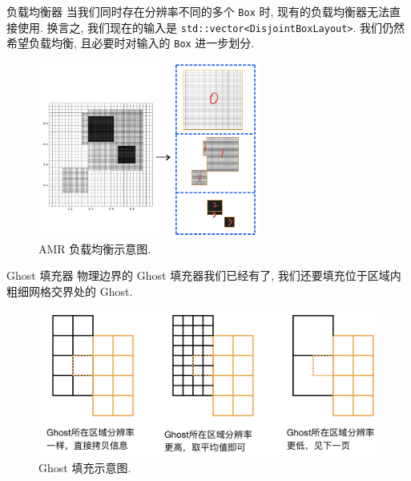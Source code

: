 \documentclass[10pt]{beamer}
\begin{document}
\begin{frame}[fragile]{负载均衡器}
    \footnotesize
    当我们同时存在分辨率不同的多个 \verb|Box| 时,
    现有的负载均衡器无法直接使用.
    换言之, 我们现在的输入是 \verb|std::vector<DisjointBoxLayout>|.
    我们仍然希望负载均衡, 且必要时对输入的 \verb|Box| 进一步划分.

    \begin{figure}[H]
        \centering
        \includegraphics[width=0.65\textwidth]{jpg/newbalance.jpeg}
        \caption{\footnotesize AMR 负载均衡示意图.}
    \end{figure}
\end{frame}

\begin{frame}[fragile]{Ghost 填充器}
    \footnotesize
    物理边界的 Ghost 填充器我们已经有了, 
    我们还要填充位于区域内粗细网格交界处的 Ghost.

    \begin{figure}[H]
        \centering
        \includegraphics[width=\textwidth]{jpg/fillghost.jpeg}
        \caption{\footnotesize Ghost 填充示意图.}
    \end{figure}
\end{frame}
\end{document}
